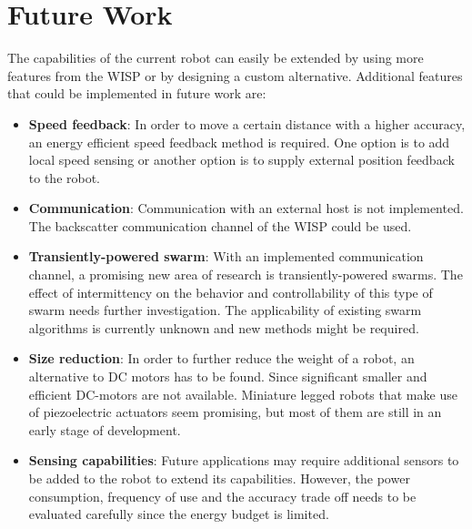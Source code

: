 \section{Future Work}
\label{sec:limitations_future_work}

The capabilities of the current robot can easily be extended by using more features from the WISP or by designing a custom alternative.
Additional features that could be implemented in future work are:

\begin{itemize}

\item \textbf{Speed feedback}: 
In order to move a certain distance with a higher accuracy, an energy efficient speed feedback method is required.
One option is to add local speed sensing or another option is to supply external position feedback to the robot.


\item \textbf{Communication}: 
Communication with an external host is not implemented.
The backscatter communication channel of the WISP could be used.

\item \textbf{Transiently-powered swarm}: 
With an implemented communication channel, a promising new area of research is transiently-powered swarms.
The effect of intermittency on the behavior and controllability of this type of swarm needs further investigation.
The applicability of existing swarm algorithms is currently unknown and new methods might be required.	

\item \textbf{Size reduction}: 
In order to further reduce the weight of a robot, an alternative to DC motors has to be found.
Since significant smaller and efficient DC-motors are not available.
Miniature legged robots that make use of piezoelectric actuators seem promising, but most of them are still in an early stage of development.

\item \textbf{Sensing capabilities}: 
Future applications may require additional sensors to be added to the robot to extend its capabilities.
However, the power consumption, frequency of use and the accuracy trade off needs to be evaluated carefully since the energy budget is limited.


\end{itemize}

